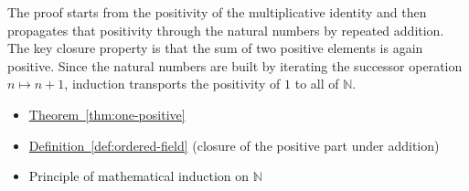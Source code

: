 \begin{remark*}
The proof starts from the positivity of the multiplicative identity and then
propagates that positivity through the natural numbers by repeated addition.
The key closure property is that the sum of two positive elements is again
positive.  Since the natural numbers are built by iterating the successor
operation $n\mapsto n+1$, induction transports the positivity of $1$ to all
of $\mathbb{N}$.
\end{remark*}

\begin{dependencies}
\begin{itemize}
  \item \hyperref[thm:one-positive]{Theorem~\ref*{thm:one-positive}}
  \item \hyperref[def:ordered-field]{Definition~\ref*{def:ordered-field}}
        \textnormal{(closure of the positive part under addition)}
  \item Principle of mathematical induction on $\mathbb{N}$
\end{itemize}
\end{dependencies}

\clearpage
